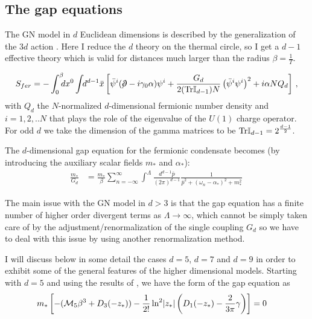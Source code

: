 \documentclass[twoside]{article}
\begin{document}
\subsection{The gap equations}
The GN model in $d$ Euclidean dimensions is described by the generalization of the $3d$ action \cite {Filothodoros:2018, Thesis Filothodoros, Petkou:1998wd, Christiansen:1999uv}. Here I reduce the $d$ theory on the thermal circle, so I get a $d-1$ effective theory which is valid for distances much larger than the radius $\beta=\frac{1}{T}$.

\begin{align}
 S_{fer} = -\int_0^\beta \!\!\!dx^0\int \!\!d^{d-1}\bar{x} \left[\bar{\psi }^{i}(\slash\!\!\!\partial  -i\gamma_0\alpha)\psi ^{i}
+\frac{G_d}{2({\rm Tr}\mathbb I_{d-1})N}\left (\bar{\psi }^{i}\psi ^{i}\right )^{2} +i\alpha NQ_d\right]\,,
\end{align}
with  $Q_d$ the $N$-normalized $d$-dimensional fermionic number density and $i=1,2,..N$ that plays the role of the eigenvalue of the $U(1)$ charge operator. For odd $d$ we take the dimension of the gamma matrices to be ${\rm Tr}{\mathbb I}_{d-1}=2^{\frac{d-1}{2}}$.


The $d$-dimensional  gap equation for the fermionic condensate becomes (by introducing the auxiliary scalar fields $m_*$ and $\alpha_*$):
\begin{align}
\frac{m_*}{G_d}&=\frac{m_*}{\beta}\sum_{n=-\infty}^\infty\int^\Lambda\!\!\frac{d^{d-1} \bar{p}}{(2\pi)^{d-1}}\frac{1}{\bar{p}^2+(\omega_n-\alpha_*)^2+m_*^2}\,
\end{align}



The main issue with the GN model in $d>3$ is that the gap equation has  a finite number of higher order divergent terms as $\Lambda\rightarrow\infty$, which cannot be simply taken care of by the adjustment/renormalization of the single coupling $G_d$ so we have to deal with this issue by using another renormalization method.

I will discuss below in some detail the cases $d=5$, $d=7$ and $d=9$ in order to exhibit some of the general features of the higher dimensional models. Starting with $d=5$ and using the results of \cite{Filothodoros:2016txa, Filothodoros:2018}, we have the form of the gap equation as
\begin{align}
\label{ge5}
m_*\left[-({\cal M}_5\beta^3+D_3(-z_*))-
\frac{1}{2!}\ln^2\!|z_*|\left(D_1(-z_*)-\frac{2}{3\pi}\gamma\right)\right]&=0\,
\end{align}
\end{document}
